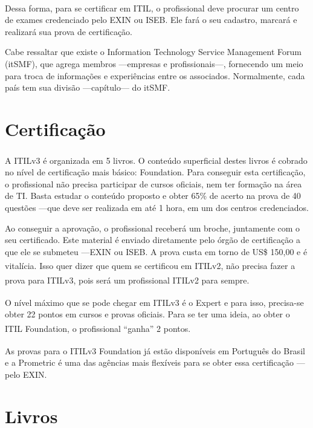 Dessa forma, para se certificar em ITIL\textsuperscript{\textregistered}, o
profissional deve procurar um centro de exames credenciado pelo EXIN ou ISEB.
Ele fará o seu cadastro, marcará e realizará sua prova de certificação.

Cabe ressaltar que existe o Information Technology Service Management Forum
(itSMF), que agrega membros ---empresas e profissionais---, fornecendo um meio
para troca de informações e experiências entre os associados. Normalmente, cada
país tem sua divisão ---capítulo--- do itSMF.
%

\section{Certificação}
\label{sec:intro:certi}

A ITIL\textsuperscript{\textregistered}v3 é organizada em 5 livros. O conteúdo
superficial destes livros é cobrado no nível de certificação mais básico:
Foundation. Para conseguir esta certificação, o profissional não precisa
participar de cursos oficiais, nem ter formação na área de TI. Basta estudar o
conteúdo proposto e obter 65\% de acerto na prova de 40 questões ---que deve
ser realizada em até 1 hora, em um dos centros credenciados.

Ao conseguir a aprovação, o profissional receberá um broche, juntamente com o
seu certificado. Este material é enviado diretamente pelo órgão de certificação
a que ele se submeteu ---EXIN ou ISEB. A prova custa em torno de US\$ 150,00 e
é vitalícia. Isso quer dizer que quem se certificou em
ITIL\textsuperscript{\textregistered}v2, não precisa fazer a prova para
ITIL\textsuperscript{\textregistered}v3, pois será um profissional
ITIL\textsuperscript{\textregistered}v2 para sempre.

O nível máximo que se pode chegar em ITIL\textsuperscript{\textregistered}v3 é
o Expert e para isso, precisa-se obter 22 pontos em cursos e provas oficiais.
Para se ter uma ideia, ao obter o ITIL\textsuperscript{\textregistered}
Foundation, o profissional ``ganha'' 2 pontos.

As provas para o ITIL\textsuperscript{\textregistered}v3 Foundation já estão
disponíveis em Português do Brasil e a Prometric é uma das agências mais
flexíveis para se obter essa certificação ---pelo EXIN.

\section{Livros}
\label{sec:intro:livros}

